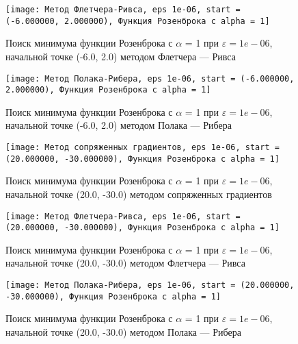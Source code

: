             \begin{figure}[H]
	        \centering
	        \texttt{[image: Метод Флетчера-Ривса, eps 1e-06, start = (-6.000000, 2.000000), Функция Розенброка с alpha = 1]}%
	        \caption{Поиск минимума функции Розенброка с $\alpha$ = 1 при $\varepsilon = 1e-06$, начальной точке (-6.0, 2.0) методом Флетчера --- Ривса}
	        \vspace*{-1.2cm}
            \end{figure}
            
            \begin{figure}[H]
	        \centering
	        \texttt{[image: Метод Полака-Рибера, eps 1e-06, start = (-6.000000, 2.000000), Функция Розенброка с alpha = 1]}%
	        \caption{Поиск минимума функции Розенброка с $\alpha$ = 1 при $\varepsilon = 1e-06$, начальной точке (-6.0, 2.0) методом Полака --- Рибера}
	        \vspace*{-1.2cm}
            \end{figure}
            
            \begin{figure}[H]
	        \centering
	        \texttt{[image: Метод сопряженных градиентов, eps 1e-06, start = (20.000000, -30.000000), Функция Розенброка с alpha = 1]}%
	        \caption{Поиск минимума функции Розенброка с $\alpha$ = 1 при $\varepsilon = 1e-06$, начальной точке (20.0, -30.0) методом сопряженных градиентов}
	        \vspace*{-1.2cm}
            \end{figure}
            
            \begin{figure}[H]
	        \centering
	        \texttt{[image: Метод Флетчера-Ривса, eps 1e-06, start = (20.000000, -30.000000), Функция Розенброка с alpha = 1]}%
	        \caption{Поиск минимума функции Розенброка с $\alpha$ = 1 при $\varepsilon = 1e-06$, начальной точке (20.0, -30.0) методом Флетчера --- Ривса}
	        \vspace*{-1.2cm}
            \end{figure}
            
            \begin{figure}[H]
	        \centering
	        \texttt{[image: Метод Полака-Рибера, eps 1e-06, start = (20.000000, -30.000000), Функция Розенброка с alpha = 1]}%
	        \caption{Поиск минимума функции Розенброка с $\alpha$ = 1 при $\varepsilon = 1e-06$, начальной точке (20.0, -30.0) методом Полака --- Рибера}
	        \vspace*{-1.2cm}
            \end{figure}
